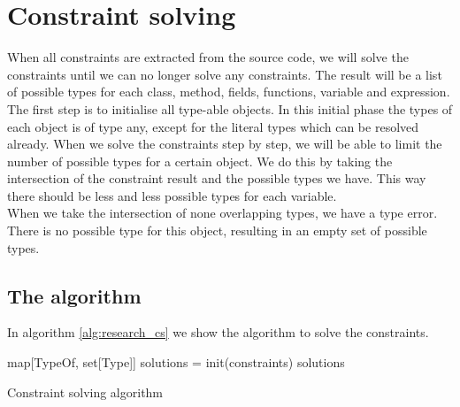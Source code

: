 \documentclass[../main.tex]{subfiles}
\begin{document}
    \section{Constraint solving}\label{sec:implementation:constraint_solving}
        When all constraints are extracted from the source code, we will solve the constraints until we can no longer solve any constraints.
    The result will be a list of possible types for each class, method, fields, functions, variable and expression.
    \\
    The first step is to initialise all type-able objects.
    In this initial phase the types of each object is of type any, except for the literal types which can be resolved already.
    When we solve the constraints step by step, we will be able to limit the number of possible types for a certain object.
    We do this by taking the intersection of the constraint result and the possible types we have.
    This way there should be less and less possible types for each variable.
    \\
    When we take the intersection of none overlapping types, we have a type error.
    There is no possible type for this object, resulting in an empty set of possible types.
    
    \subsection{The algorithm}
    In algorithm \ref{alg:research_cs} we show the algorithm to solve the constraints.
        
    \vspace{5 mm}
    \begin{algorithm}[H]
     \BlankLine
	 map[TypeOf, set[Type]] solutions = init(constraints)\;           \label{alg:research_cs:init_solutions}
     \BlankLine
	                                                                  \label{alg:research_cs:loop_end}
	 \BlankLine
	 \Return solutions\;     \label{alg:research_cs:return}
	 \caption{Constraint solving algorithm}
	 \label{alg:research_cs}
	\end{algorithm}
    
\end{document}
